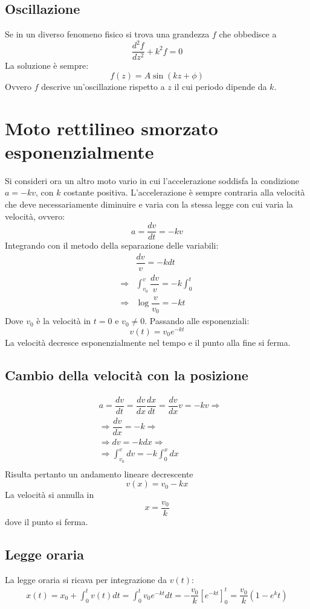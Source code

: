 \documentclass[class=book, crop=false, oneside, 12pt]{standalone}
\begin{document}
	\subsection{Oscillazione}
	Se in un diverso fenomeno fisico si trova una grandezza $f$ che obbedisce a
	$$\dfrac{d^2f}{dz^2}+k^2f=0$$
	La soluzione \`e sempre:
	$$f(z)=A\sin(kz+\phi)$$
	Ovvero $f$ descrive un'oscillazione rispetto a $z$ il cui periodo dipende da $k$.
\section{Moto rettilineo smorzato esponenzialmente}
Si consideri ora un altro moto vario in cui l'accelerazione soddisfa la condizione $a = -kv$, con $k$ costante positiva.
L'accelerazione \`e sempre contraria alla velocit\`a che deve necessariamente diminuire e varia con la stessa legge con cui varia la velocit\`a, ovvero:
$$a = \dfrac{dv}{dt} = -kv$$
Integrando con il metodo della separazione delle variabili:
\begin{align*}
	&\dfrac{dv}{v} = -kdt\\
	\Rightarrow&\int_{v_0}^v\dfrac{dv}{v} = -k\int_0^t\\
	\Rightarrow &\log\dfrac{v}{v_0} = -kt
\end{align*}
Dove $v_0$ \`e la velocit\`a in $t=0$ e $v_0\neq 0$.
Passando alle esponenziali:
$$v(t) = v_0e^{-kt}$$
La velocit\`a decresce esponenzialmente nel tempo e il punto alla fine si ferma.
	\subsection{Cambio della velocit\`a con la posizione}
	\begin{align*}
		&a = \dfrac{dv}{dt}=\dfrac{dv}{dx}\dfrac{dx}{dt}=\dfrac{dv}{dx}v = -kv\Rightarrow\\
		&\Rightarrow \dfrac{dv}{dx}=-k\Rightarrow\\
		&\Rightarrow dv = -kdx\Rightarrow\\
		&\Rightarrow \int_{v_0}^v dv = -k \int_0^xdx\\
	\end{align*}
	Risulta pertanto un andamento lineare decrescente
	$$v(x)=v_0-kx$$
	La velocit\`a si annulla in
	$$x=\dfrac{v_0}{k}$$
	dove il punto si ferma.
	\subsection{Legge oraria}
	La legge oraria si ricava per integrazione da $v(t)$:
	\begin{align*}
		x(t)=x_0+\int_0^t v(t)dt=\int_0^tv_0e^{-kt}dt=-\dfrac{v_0}{k}[e^{-kt}]_0^t=\dfrac{v_0}{k}(1-e^kt)
	\end{align*}
\end{document}
